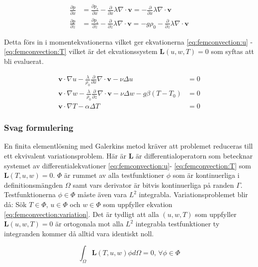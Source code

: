 \begin{align}
\label{eq:femconvection:partx}
\frac{\partial p}{\partial x} &= \frac{\partial p_s}{\partial x} -
\frac{\partial}{\partial x} \lambda\nabla\cdot\mathbf{v} = -
\frac{\partial}{\partial x} \lambda\nabla\cdot\mathbf{v}
\\
\label{eq:femconvection:partz}
\frac{\partial p}{\partial z} &= \frac{\partial p_s}{\partial z} -
\frac{\partial}{\partial z} \lambda\nabla\cdot\mathbf{v} =
-g\rho_0 - \frac{\partial}{\partial z} \lambda\nabla\cdot\mathbf{v}
\end{align}

\noindent
Detta förs in i momentekvationerna vilket ger ekvationerna \eqref{eq:femconvection:u} -
\eqref{eq:femconvection:T} vilket är det ekvationssystem $\mathbf{L}(u,w,T) = 0$
som syftas att bli evaluerat.

\begin{align}
\label{eq:femconvection:u}
\mathbf{v}\cdot\nabla u -
\frac{\lambda}{\rho_0}\frac{\partial}{\partial x}\nabla\cdot\mathbf{v} -\nu\Delta u &= 0
\\
\label{eq:femconvection:w}
\mathbf{v}\cdot\nabla w -
\frac{\lambda}{\rho_0}\frac{\partial}{\partial z}\nabla\cdot\mathbf{v}
- \nu\Delta w - g\beta(T-T_0) &= 0 \\ 
\label{eq:femconvection:T}
\mathbf{v}\cdot\nabla T - \alpha\Delta T &= 0
\end{align}

\subsubsection{Svag formulering}

En finita elementlösning med Galerkins metod kräver att problemet reduceras till
ett ekvivalent variationsproblem. 
Här är $\mathbf{L}$ är differentialoperatorn
som betecknar systemet av differentialekvationer \eqref{eq:femconvection:u}-
\eqref{eq:femconvection:T} som $\mathbf{L}(T,u,w) = 0$.
$\Phi$ är rummet av alla testfunktioner $\phi$ som är kontinuerliga i
definitionsmängden $\Omega$ samt vars derivator är bitvis kontinuerliga på randen
$\Gamma$. Testfunktionerna $\phi \in \Phi$ måste även vara $L^2$ integrabla.
Variationsproblemet blir då: Sök $T\in\Phi$, $u\in\Phi$ och
$w\in\Phi$ som uppfyller ekvation \eqref{eq:femconvection:variation}. Det är tydligt
att alla $(u,w,T)$ som uppfyller $\mathbf{L}(u,w,T) = 0$ är ortogonala mot alla
$L^2$ integrabla testfunktioner ty integranden kommer då alltid vara identiskt noll.

\begin{equation}
\label{eq:femconvection:variation}
\int_\Omega \mathbf{L}(T,u,w) \phi d\Omega = 0\mbox{,  } \forall \phi \in \Phi
\end{equation}

